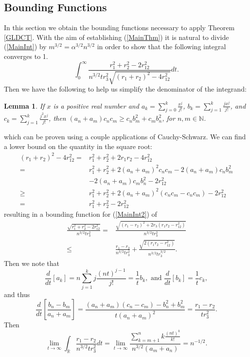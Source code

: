 \documentclass[12pt]{amsart}
\newtheorem{lemma}[theorem]{Lemma}
\theoremstyle{remark}
\begin{document}
\subsection{Bounding Functions}
In this section we obtain the bounding functions necessary to apply Theorem \ref{GLDCT}.  With the aim of establishing (\ref{MainThm}) it is natural to divide (\ref{MainInt}) by $m^{3/2}=\alpha^{3/2}n^{3/2}$ in order to show that the following integral converges to 1.
\begin{equation}\label{MainInt2}\int_0^\infty\frac{r_1^2+r_2^2-2r_{12}^2}{n^{3/2}tr_3^2\sqrt{(r_1+r_2)^2-4r_{12}^2}}dt.
\end{equation}
Then we have the following to help us simplify the denominator of the integrand:
\begin{lemma}\label{CSApplication}
If $x$ is a positive real number and $a_k=\sum_{j=0}^k\frac{x^j}{j!}$, $b_k=\sum_{j=1}^k\frac{jx^j}{j!}$, and $c_k=\sum_{j=1}^k\frac{j^2x^j}{j!}$, then $(a_n+a_m)c_nc_m\ge c_nb_m^2+c_mb_n^2$, for $n,m\in\mathbb{N}$.
\end{lemma}
\noindent which can be proven using a couple applications of Cauchy-Schwarz.  We can find a lower bound on the quantity in the square root:
\begin{align*}
(r_1+r_2)^2-4r_{12}^2=&r_1^2+r_2^2+2r_1r_2-4r_{12}^2
\\=&r_1^2+r_2^2+2(a_n+a_m)^2c_nc_m-2(a_n+a_m)c_nb_m^2
\\&-2(a_n+a_m)c_mb_n^2-2r_{12}^2
\\\ge& r_1^2+r_2^2+2(a_n+a_m)^2(c_nc_m-c_nc_m)-2r_{12}^2
\\=&r_1^2+r_2^2-2r_{12}^2
\end{align*}
resulting in a bounding function for (\ref{MainInt2}) of
\begin{align*}\frac{\sqrt{r_1^2+r_2^2-2r_{12}^2}}{n^{3/2}tr_3^2}=&\frac{\sqrt{(r_1-r_2)^2+2r_3(r_1r_2-r_{12}^2)}}{n^{3/2}tr_3^2}
\\\le&\frac{r_1-r_2}{n^{3/2}tr_3^2}+\frac{\sqrt{2(r_1r_2-r_{12}^2)}}{n^{3/2}tr_3^{3/2}}.
\end{align*}
Then we note that
\[\frac{d}{dt}\left[a_k\right]=n\sum_{j=1}^kj\frac{(nt)^{j-1}}{j!}=\frac{1}{t}b_k,\text{ and }\frac{d}{dt}\left[b_k\right]=\frac{1}{t}c_k,\] and thus
\[\frac{d}{dt}\left[\frac{b_n-b_m}{a_n+a_m}\right]=\frac{(a_n+a_m)(c_n-c_m)-b_n^2+b_m^2}{t(a_n+a_m)^2}=\frac{r_1-r_2}{tr_3^2}.\]
Then
\[\lim_{t\to\infty}\int_\mathbb{R}\frac{r_1-r_2}{n^{3/2}tr_3^2}dt=\lim_{t\rightarrow\infty}\frac{\sum_{k=m+1}^nk\frac{(nt)^k}{k!}}{n^{3/2}(a_m+a_n)}=n^{-1/2}.\]
\end{document}
